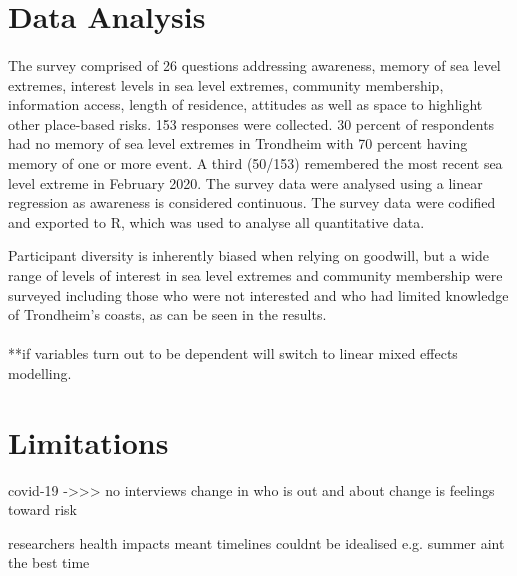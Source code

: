  
\section{Data Analysis}
 
\paragraph{}
  The survey comprised of 26 questions addressing awareness, memory of sea level extremes, interest levels in sea level extremes, community membership, information access, length of residence, attitudes as well as space to highlight other place-based risks. 153 responses were collected. 30 percent of respondents had no memory of sea level extremes in Trondheim with 70 percent having memory of one or more event. A third (50/153) remembered the most recent sea level extreme in February 2020. The survey data were analysed using a linear regression as awareness is considered continuous. The survey data were codified and exported to R, which was used to analyse all quantitative data. 

  Participant diversity is inherently biased when relying on goodwill, but a wide range of levels of interest in sea level extremes and community membership were surveyed including those who were not interested and who had limited knowledge of Trondheim’s coasts, as can be seen in the results.
  \paragraph{}

**if variables turn out to be dependent will switch to linear mixed effects modelling.  


\section{Limitations}
covid-19 ->>> no interviews
change in who is out and about
change is feelings toward risk

researchers health impacts meant timelines couldnt be idealised
e.g. summer aint the best time



